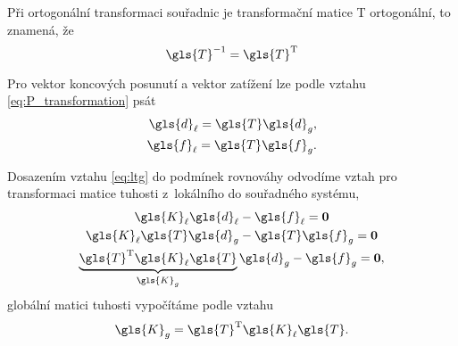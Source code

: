 Při ortogonální transformaci souřadnic je transformační matice \gls{T} ortogonální, to znamená, že
\begin{equation}
    \gls{T}^{-1} = \gls{T}^{\mathrm{T}}
\end{equation}

Pro vektor koncových posunutí a vektor zatížení lze podle vztahu \ref{eq:P_transformation} psát
\begin{equation} \label{eq:ltg}
    \begin{aligned}
        \gls{d}_{\ell} = \gls{T} \gls{d}_{g}, \\
        \gls{f}_{\ell} = \gls{T} \gls{f}_{g}.
    \end{aligned}
\end{equation}

Dosazením vztahu \ref{eq:ltg} do podmínek rovnováhy odvodíme vztah pro transformaci matice tuhosti z~lokálního do souřadného systému,
\begin{equation}
    \begin{gathered}
        \gls{K}_{\ell} \gls{d}_{\ell} - \gls{f}_{\ell} = \matr{0} \\
        \gls{K}_{\ell} \gls{T} \gls{d}_{g} - \gls{T} \gls{f}_{g} = \matr{0} \\
        \underbrace{\gls{T}^\mathrm{T} \gls{K}_{\ell} \gls{T}}_{\gls{K}_g} \gls{d}_{g} - \gls{f}_{g} = \matr{0},
    \end{gathered}
\end{equation}
globální matici tuhosti vypočítáme podle vztahu
\begin{equation}
    \gls{K}_g = \gls{T}^\mathrm{T} \gls{K}_{\ell} \gls{T}.
\end{equation}